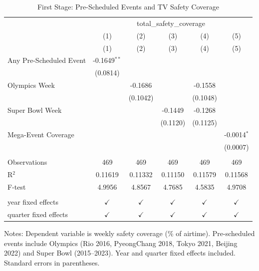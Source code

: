 
\begin{table}[htbp]
   \caption{\label{tab:first_stage} First Stage: Pre-Scheduled Events and TV Safety Coverage}
   \bigskip
   \centering
   \begin{tabular}{lccccc}
      \toprule
       & \multicolumn{5}{c}{total\_safety\_coverage}\\
                              & (1)            & (2)           & (3)           & (4)           & (5) \\   
                              & (1)            & (2)           & (3)           & (4)           & (5)\\  
      \midrule 
      Any Pre-Scheduled Event & -0.1649$^{**}$ &               &               &               &   \\   
                              & (0.0814)       &               &               &               &   \\   
      Olympics Week           &                & -0.1686       &               & -0.1558       &   \\   
                              &                & (0.1042)      &               & (0.1048)      &   \\   
      Super Bowl Week         &                &               & -0.1449       & -0.1268       &   \\   
                              &                &               & (0.1120)      & (0.1125)      &   \\   
      Mega-Event Coverage     &                &               &               &               & -0.0014$^{*}$\\   
                              &                &               &               &               & (0.0007)\\   
       \\
      Observations            & 469            & 469           & 469           & 469           & 469\\  
      R$^2$                   & 0.11619        & 0.11332       & 0.11150       & 0.11579       & 0.11568\\  
      F-test                  & 4.9956         & 4.8567        & 4.7685        & 4.5835        & 4.9708\\  
       \\
      year fixed effects      & $\checkmark$   & $\checkmark$  & $\checkmark$  & $\checkmark$  & $\checkmark$\\   
      quarter fixed effects   & $\checkmark$   & $\checkmark$  & $\checkmark$  & $\checkmark$  & $\checkmark$\\   
      \bottomrule
   \end{tabular}
   
   \par \raggedright 
   Notes: Dependent variable is weekly safety coverage (\% of airtime). Pre-scheduled events include Olympics (Rio 2016, PyeongChang 2018, Tokyo 2021, Beijing 2022) and Super Bowl (2015--2023). Year and quarter fixed effects included. Standard errors in parentheses.
\end{table}


